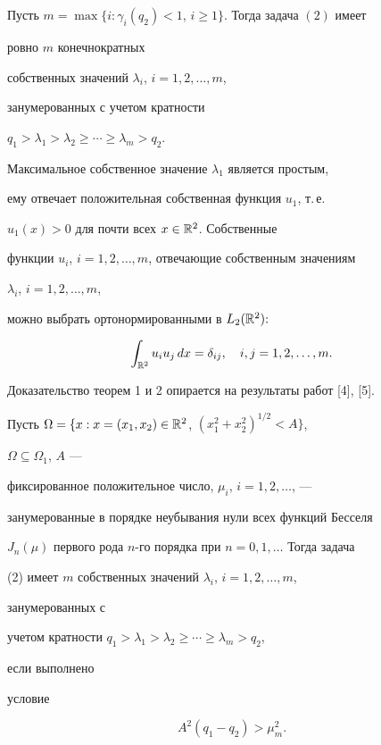 \begin{thm} 


Пусть $m=\max\{i:\gamma_i(q_2)<1$, $i\ge1\}$. Тогда задача $(2)$ имеет 


ровно $m$ конечнократных 


собственных значений $\lambda_i$, $i=1,2,\dotsc,m$, 


занумерованных с учетом кратности 


$q_1>\lambda_1>\lambda_2\ge\dotsb\ge\lambda_m>q_2$. 


Максимальное собственное значение $\lambda_1$ является простым, 


ему отвечает положительная собственная функция $u_1$, т.\,е. 


$u_1(x)>0$ для почти всех $x\in\Bbb R^2$. Собственные 


функции $u_i$, $i=1,2,\dotsc,m$, отвечающие собственным значениям 


$\lambda_i$, $i=1,2,\dotsc,m$, 


можно выбрать ортонормированными в $L_2(\Bbb R^2){:}$ 


$$ 


\int_{\Bbb R^2}u_i u_j\,dx=\delta_{i j},\quad i,j=1,2,\dotsc,m. 


$$ 


\end{thm} 


 


Доказательство теорем 1 и 2 опирается на результаты работ [4], [5]. 


 


\begin{cor} 


Пусть $\Omega=\{x:x=(x_1,x_2)\in\Bbb R^2$, $(x^2_1+x^2_2)^{1/2}<A\}$, 


$\Omega\subseteq\Omega_1$, $A$ --- 


фиксированное положительное число, $\mu_i$, $i=1,2,\dotsc$, --- 


занумерованные в порядке неубывания нули всех функций Бесселя 


$J_n(\mu)$ первого рода $n$-го порядка при $n=0,1,\dotsc$ Тогда задача 


(2) имеет $m$ собственных значений $\lambda_i$, $i=1,2,\dotsc,m$, 


занумерованных с 


учетом кратности $q_1>\lambda_1>\lambda_2\ge\dotsb\ge\lambda_m>q_2$, 


если выполнено 


условие 


$$ 


A^2(q_1-q_2)>\mu^2_m. 


$$ 


\end{cor} 


